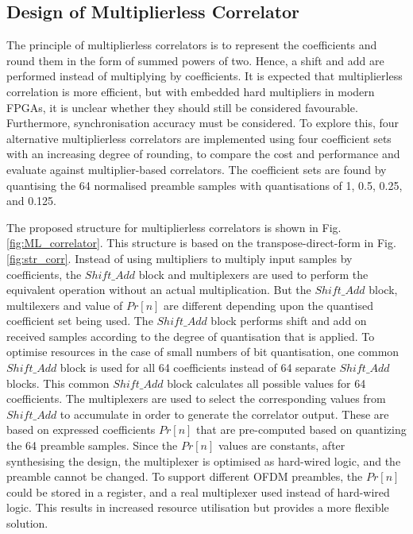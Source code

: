 \subsection{Design of Multiplierless Correlator}

The principle of multiplierless correlators is to represent the coefficients and round them in the form of summed powers of two. 
Hence, a shift and add are performed instead of multiplying by coefficients. 
It is expected that multiplierless correlation is more efficient, but with embedded hard multipliers in modern FPGAs, it is unclear whether they should still be considered favourable. 
Furthermore, synchronisation accuracy must be considered.
To explore this, four alternative multiplierless correlators are implemented using four coefficient sets with an increasing degree of rounding, to compare the cost and performance and evaluate against multiplier-based correlators. 
The coefficient sets are found by quantising the 64 normalised preamble samples with quantisations of 1, 0.5, 0.25, and 0.125. 

The proposed structure for multiplierless correlators is shown in Fig. \ref{fig:ML_correlator}. 
This structure is based on the transpose-direct-form in Fig. \ref{fig:str_corr}. 
Instead of using multipliers to multiply input samples by coefficients, the $Shift\_Add$ block and multiplexers are used to perform the equivalent operation without an actual multiplication. 
But the  $Shift\_Add$ block, multilexers and value of $Pr[n]$ are different depending upon the quantised coefficient set being used.  
The $Shift\_Add$ block performs shift and add on received samples according to the degree of quantisation that is applied.  
To optimise resources in the case of small numbers of bit quantisation, one common $Shift\_Add$ block is used for all 64 coefficients instead of 64 separate $Shift\_Add$ blocks. 
This common $Shift\_Add$ block calculates all possible values for 64 coefficients.  
The multiplexers are used to select the corresponding values from $Shift\_Add$ to accumulate in order to generate the correlator output.
These are based on expressed coefficients $Pr[n]$ that are pre-computed based on quantizing the 64 preamble samples.
Since the $Pr[n]$ values are constants, after synthesising the design, the multiplexer is optimised as hard-wired logic, and the preamble cannot be changed.
To support different OFDM preambles, the $Pr[n]$ could be stored in a register, and a real multiplexer used instead of hard-wired logic.  
This results in increased resource utilisation but provides a more flexible solution. 

